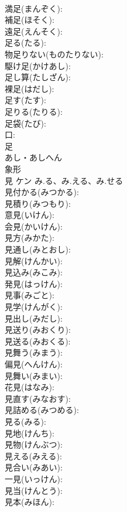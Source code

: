 \documentclass[8pt]{extreport}
\begin{document}
\begin{CJK}{UTF8}{min}
\\	満足(まんぞく): 
\\	補足(ほそく): 
\\	遠足(えんそく): 
\\	足る(たる): 
\\	物足りない(ものたりない): 
\\	駆け足(かけあし): 
\\	足し算(たしざん): 
\\	裸足(はだし): 
\\	足す(たす): 
\\	足りる(たりる): 
\\	足袋(たび): 
\\	口: 
\\	足	
\\	あし・あしへん	
\\	象形 
\\	見	ケン	み.る、み.える、み.せる		
\\	見付かる(みつかる): 
\\	見積り(みつもり): 
\\	意見(いけん): 
\\	会見(かいけん): 
\\	見方(みかた): 
\\	見通し(みとおし): 
\\	見解(けんかい): 
\\	見込み(みこみ): 
\\	発見(はっけん): 
\\	見事(みごと): 
\\	見学(けんがく): 
\\	見出し(みだし): 
\\	見送り(みおくり): 
\\	見送る(みおくる): 
\\	見舞う(みまう): 
\\	偏見(へんけん): 
\\	見舞い(みまい): 
\\	花見(はなみ): 
\\	見直す(みなおす): 
\\	見詰める(みつめる): 
\\	見る(みる): 
\\	見地(けんち): 
\\	見物(けんぶつ): 
\\	見える(みえる): 
\\	見合い(みあい): 
\\	一見(いっけん): 
\\	見当(けんとう): 
\\	見本(みほん): 

\end{CJK}
\end{document}
